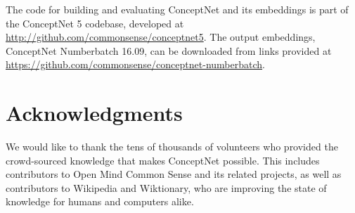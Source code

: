 \documentclass[letterpaper]{article}
\begin{document}
The code for building and evaluating ConceptNet and its embeddings is part of
the ConceptNet 5 codebase, developed at \url{http://github.com/commonsense/conceptnet5}.
The output embeddings, ConceptNet Numberbatch 16.09, can be downloaded from links
provided at \url{https://github.com/commonsense/conceptnet-numberbatch}.

\section{Acknowledgments}

We would like to thank the tens of thousands of volunteers who provided the
crowd-sourced knowledge that makes ConceptNet possible. This includes
contributors to Open Mind Common Sense and its related projects, as well as
contributors to Wikipedia and Wiktionary, who are improving the state of
knowledge for humans and computers alike.



\end{document}
